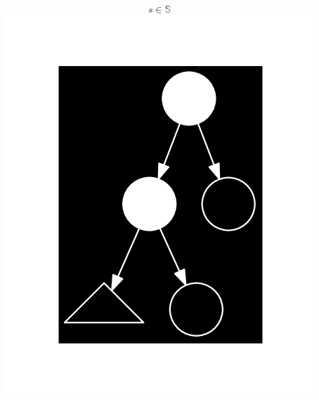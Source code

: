 \begin{frame}
\begin{columns}
\begin{center}
$$s\in\mathbb{S}$$
\includegraphics[scale=0.5]{figures/shape}
\end{center}

\end{columns}

\end{frame}

